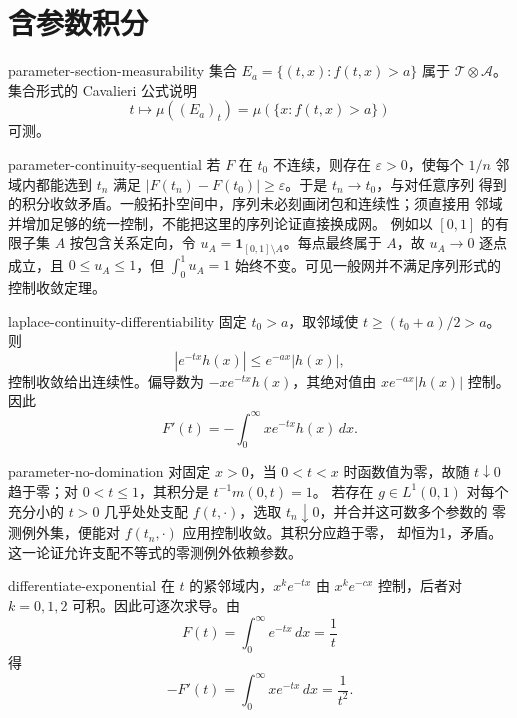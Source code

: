 \chapter{含参数积分}

\begin{solution}{parameter-section-measurability}
集合 \(E_a=\{(t,x):f(t,x)>a\}\) 属于
\(\mathcal T\otimes\mathcal A\)。集合形式的 Cavalieri 公式说明
\[
 t\mapsto\mu((E_a)_t)
=\mu(\{x:f(t,x)>a\})
\]
可测。
\end{solution}

\begin{solution}{parameter-continuity-sequential}
若 \(F\) 在 \(t_0\) 不连续，则存在 \(\varepsilon>0\)，使每个
\(1/n\) 邻域内都能选到 \(t_n\) 满足
\(|F(t_n)-F(t_0)|\ge\varepsilon\)。于是 \(t_n\to t_0\)，与对任意序列
得到的积分收敛矛盾。一般拓扑空间中，序列未必刻画闭包和连续性；须直接用
邻域并增加足够的统一控制，不能把这里的序列论证直接换成网。
例如以 \([0,1]\) 的有限子集 \(A\) 按包含关系定向，令
\(u_A=\mathbf1_{[0,1]\setminus A}\)。每点最终属于 \(A\)，故
\(u_A\to0\) 逐点成立，且 \(0\le u_A\le1\)，但
\(\int_0^1u_A=1\) 始终不变。可见一般网并不满足序列形式的控制收敛定理。
\end{solution}

\begin{solution}{laplace-continuity-differentiability}
固定 \(t_0>a\)，取邻域使 \(t\ge(t_0+a)/2>a\)。则
\[
 |e^{-tx}h(x)|\le e^{-ax}|h(x)|,
\]
控制收敛给出连续性。偏导数为
\(-xe^{-tx}h(x)\)，其绝对值由
\(xe^{-ax}|h(x)|\) 控制。因此
\[
 F'(t)=-\int_0^\infty xe^{-tx}h(x)\,dx .
\]
\end{solution}

\begin{solution}{parameter-no-domination}
对固定 \(x>0\)，当 \(0<t<x\) 时函数值为零，故随 \(t\downarrow0\)
趋于零；对 \(0<t\le1\)，其积分是 \(t^{-1}m(0,t)=1\)。
若存在 \(g\in L^1(0,1)\) 对每个充分小的 \(t>0\) 几乎处处支配
\(f(t,\cdot)\)，选取 \(t_n\downarrow0\)，并合并这可数多个参数的
零测例外集，便能对 \(f(t_n,\cdot)\) 应用控制收敛。其积分应趋于零，
却恒为1，矛盾。这一论证允许支配不等式的零测例外依赖参数。
\end{solution}

\begin{solution}{differentiate-exponential}
在 \(t\) 的紧邻域内，\(x^ke^{-tx}\) 由
\(x^ke^{-cx}\) 控制，后者对 \(k=0,1,2\) 可积。因此可逐次求导。由
\[
 F(t)=\int_0^\infty e^{-tx}\,dx=\frac1t
\]
得
\[
 -F'(t)=\int_0^\infty xe^{-tx}\,dx=\frac1{t^2}.
\]
\end{solution}

